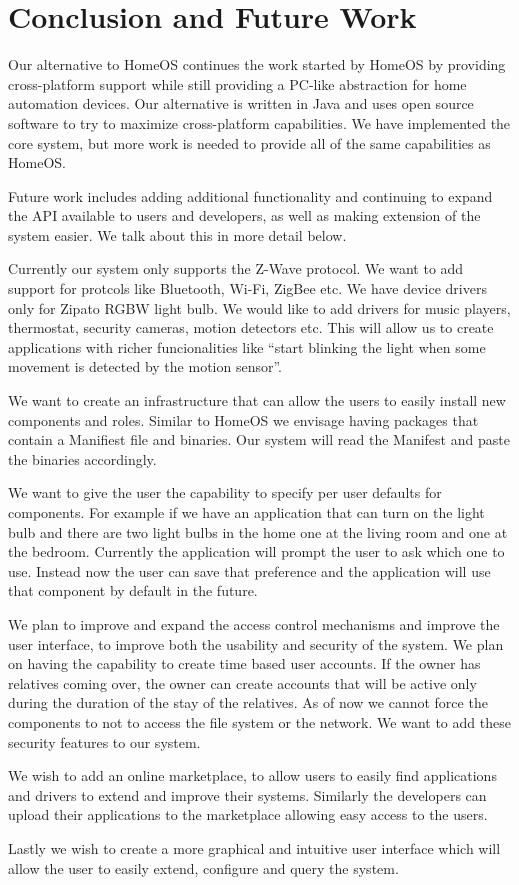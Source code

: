 \section{Conclusion and Future Work}
\label{sec:future}
Our alternative to HomeOS continues the work started by HomeOS by providing
cross-platform support while still providing a PC-like abstraction for home
automation devices. Our alternative is written in Java and uses open source
software to try to maximize cross-platform capabilities. We have implemented the
core system, but more work is needed to provide all of the same capabilities as
HomeOS.

Future work includes adding additional functionality and continuing to expand
the API available to users and developers, as well as making extension of the
system easier. We talk about this in more detail below.

Currently our system only supports the Z-Wave protocol. We want
to add support for protcols like Bluetooth, Wi-Fi, ZigBee etc. We have device
drivers only for Zipato RGBW light bulb. We would like to add drivers for music
players, thermostat, security cameras, motion detectors etc. This will allow us
to create applications with richer funcionalities like ``start blinking the
light when some movement is detected by the motion sensor''.

We want to create an infrastructure that can allow the users to easily install
new components and roles. Similar to HomeOS we envisage having packages that
contain a Manifiest file and binaries. Our system will read the Manifest and
paste the binaries accordingly.

We want to give the user the capability to specify per user defaults for
components. For example if we have an application that can turn on the light
bulb and there are two light bulbs in the home one at the living room and one
at the bedroom. Currently the application will prompt the user to ask which one
to use. Instead now the user can save that preference and the application will
use that component by default in the future.

We plan to improve and expand the access control mechanisms and improve the user
interface, to improve both the usability and security of the system. We plan on
having the capability to create time based user accounts. If the owner has
relatives coming over, the owner can create accounts that will be active only
during the duration of the stay of the relatives. As of now we cannot force the
components to not to access the file system or the network. We want to add these
security features to our system.

We wish to add an online marketplace, to allow users to easily find applications
and drivers to extend and improve their systems. Similarly the developers can
upload their applications to the marketplace allowing easy access to the users.

Lastly we wish to create a more graphical and intuitive user interface which
will allow the user to easily extend, configure and query the system.
